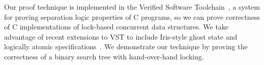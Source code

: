 Our proof technique is implemented in the Verified Software Toolchain~\cite{plfcc}, a system for proving separation logic properties of C programs, so we can prove correctness of C implementations of lock-based concurrent data structures. We take advantage of recent extensions to VST to include Iris-style ghost state and logically atomic specifications~\cite{vst-iris}. We demonstrate our technique by proving the correctness of a binary search tree with hand-over-hand locking. %





